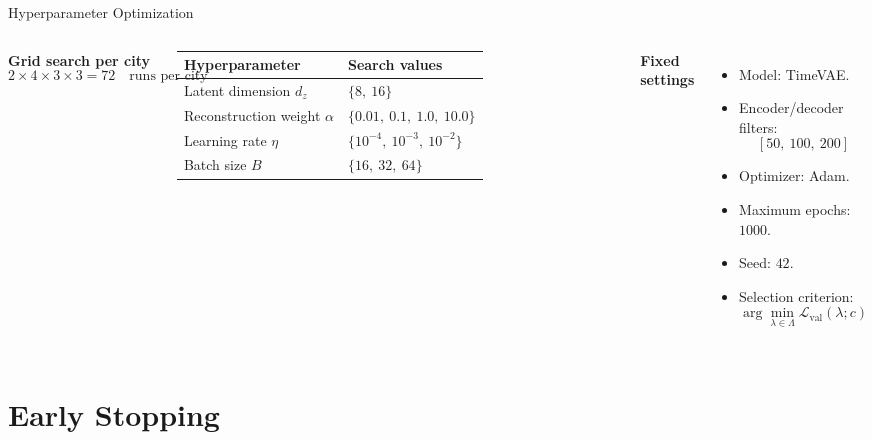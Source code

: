 \documentclass[aspectratio=169,10pt]{beamer}
\begin{document}
\begin{frame}{Hyperparameter Optimization}
  \begin{columns}[T]
      \textbf{Grid search per city}
      \[
        2\times4\times3\times3 = 72
        \quad\text{runs per city}
      \]
      \vspace{0.2em}

      \begin{tabular}{@{}ll@{}}
        \toprule
        Hyperparameter & Search values \\
        \midrule
        Latent dimension $d_z$ & $\{8,\ 16\}$ \\
        Reconstruction weight $\alpha$ & $\{0.01,\ 0.1,\ 1.0,\ 10.0\}$ \\
        Learning rate $\eta$ & $\{10^{-4},\ 10^{-3},\ 10^{-2}\}$ \\
        Batch size $B$ & $\{16,\ 32,\ 64\}$ \\
        \bottomrule
      \end{tabular}

      \textbf{Fixed settings}
      \begin{itemize}
        \item Model: TimeVAE.
        \item Encoder/decoder filters:
          \[
            [50,\ 100,\ 200]
          \]
        \item Optimizer: Adam.
        \item Maximum epochs: $1000$.
        \item Seed: $42$.
        \item Selection criterion:
          \[
            \arg\min_{\lambda\in\Lambda}
            \mathcal{L}_{\mathrm{val}}(\lambda;c)
          \]
      \end{itemize}
  \end{columns}
\end{frame}

\section{Early Stopping}
\end{document}
